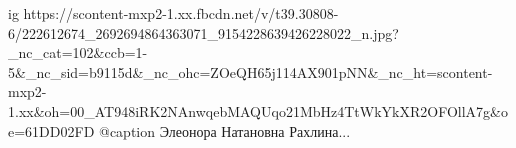  
 
 
 
 

\ifcmt
  ig https://scontent-mxp2-1.xx.fbcdn.net/v/t39.30808-6/222612674_2692694864363071_9154228639426228022_n.jpg?_nc_cat=102&ccb=1-5&_nc_sid=b9115d&_nc_ohc=ZOeQH65j114AX901pNN&_nc_ht=scontent-mxp2-1.xx&oh=00_AT948iRK2NAnwqebMAQUqo21MbHz4TtWkYkXR2OFOllA7g&oe=61DD02FD
  @caption Элеонора Натановна Рахлина...
\fi
